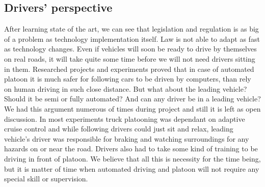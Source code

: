 \subsection{Drivers' perspective}
After learning state of the art, we can see that legislation and regulation is as big of a problem as technology implementation itself. Law is not able to adapt as fast as technology changes. Even if vehicles will soon be ready to drive by themselves on real roads, it will take quite some time before we will not need drivers sitting in them. Researched projects and experiments proved that in case of automated platoon it is much safer for following cars to be driven by computers, than rely on human driving in such close distance. But what about the leading vehicle? Should it be semi or fully automated? And can any driver be in a leading vehicle? We had this argument numerous of times during project and still it is left as open discussion. In most experiments truck platooning was dependant on adaptive cruise control and while following drivers could just sit and relax, leading vehicle's driver was responsible for braking and watching surroundings for any hazards on or near the road. Drivers also had to take some kind of training to be driving in front of platoon. We believe that all this is necessity for the time being, but it is matter of time when automated driving and platoon will not require any special skill or supervision.
%